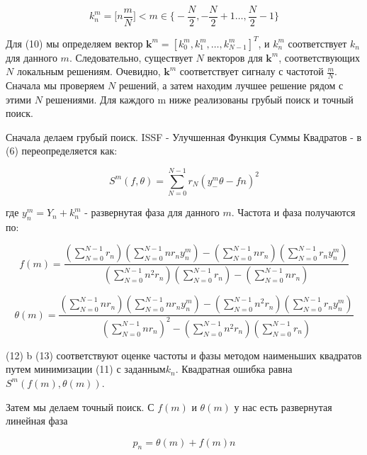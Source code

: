 \begin{equation}
\label{eq:equation1.50}	
	k_{n}^{m} = \biggl[n \frac{m}{N}\biggl] < m \in \biggl\{-\frac{N}{2}, -\frac{N}{2}+1 \ldots , \frac{N}{2}-1 \biggl\}
\end{equation}

Для (10) мы определяем вектор $\textbf{k}^m = [k^m_0, k^m_1, \ldots, k^m_{N- 1}]^T$, и $k^m_n$ соответствует $k_n$ для данного $m$. Следовательно, существует $N$ векторов для $\textbf{k}^m$, соответствующих $N$ локальным решениям. Очевидно, $\textbf{k}^m$ соответствует сигналу с частотой $\frac{m}{N}$. Сначала мы проверяем $N$ решений, а затем находим лучшее решение рядом с этими $N$ решениями. Для каждого m ниже реализованы грубый поиск и точный поиск.

Сначала делаем грубый поиск. ISSF - Улучшенная Функция Суммы Квадратов - в (6) переопределяется как:

\begin{equation}
\label{eq:equation1.51}	
	S^m(f,\theta) =\sum^{N-1}_{N=0} r_N(y^m_ -\theta-fn)^2
\end{equation}

где $y^m_n = Y_n + k^m_n$ - развернутая фаза для данного $m$. Частота и фаза получаются по:

\begin{equation}
\label{eq:equation1.52}	
	f(m) = \frac{(\sum^{N-1}_{N=0}r_n) (\sum^{N-1}_{N=0}n r_n y^m_n)- (\sum^{N-1}_{N=0}n r_n)(\sum^{N-1}_{N=0}r_n y^m_n) }                           {(\sum^{N-1}_{N=0}n^2 r_n)(\sum^{N-1}_{N=0}r_n)-(\sum^{N-1}_{N=0}nr_n)}
\end{equation}

\begin{equation}
\label{eq:equation1.53}		
	\theta(m) = \frac{(\sum^{N-1}_{N=0}nr_n) (\sum^{N-1}_{N=0}n r_n y^m_n)- (\sum^{N-1}_{N=0}n^2 r_n)(\sum^{N-1}_{N=0}r_n y^m_n) }                          {(\sum^{N-1}_{N=0}n r_n)^2 - (\sum^{N-1}_{N=0}n^2 r_n)(\sum^{N-1}_{N=0}r_n)}
\end{equation}

(12) b (13) соответствуют оценке частоты и фазы методом наименьших квадратов путем минимизации (11) с заданным$k_n$. Квадратная ошибка равна $S^m (f (m), \theta (m))$.

Затем мы делаем точный поиск. С $f (m)$ и $\theta (m)$ у нас есть развернутая линейная фаза

\begin{equation}
\label{eq:equation1.54}	
	p_n= \theta(m)+f(m)n
\end{equation}

